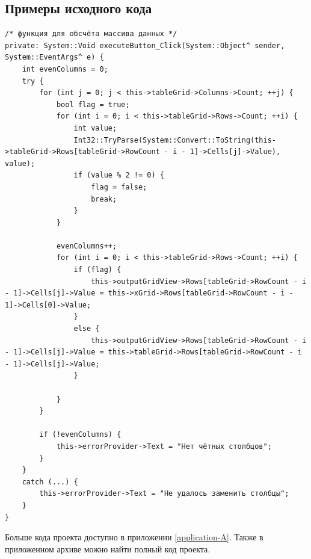 \subsection{Примеры исходного кода}
\begin{verbatim}
/* функция для обсчёта массива данных */
private: System::Void executeButton_Click(System::Object^ sender, System::EventArgs^ e) {
    int evenColumns = 0;
    try {
        for (int j = 0; j < this->tableGrid->Columns->Count; ++j) {
            bool flag = true;
            for (int i = 0; i < this->tableGrid->Rows->Count; ++i) {
                int value;
                Int32::TryParse(System::Convert::ToString(this->tableGrid->Rows[tableGrid->RowCount - i - 1]->Cells[j]->Value), value);
                if (value % 2 != 0) {
                    flag = false;
                    break;
                }
            }
    
            evenColumns++;
            for (int i = 0; i < this->tableGrid->Rows->Count; ++i) {
                if (flag) {
                    this->outputGridView->Rows[tableGrid->RowCount - i - 1]->Cells[j]->Value = this->xGrid->Rows[tableGrid->RowCount - i - 1]->Cells[0]->Value;
                }
                else {
                    this->outputGridView->Rows[tableGrid->RowCount - i - 1]->Cells[j]->Value = this->tableGrid->Rows[tableGrid->RowCount - i - 1]->Cells[j]->Value;
                }
    
            }
        }
    
        if (!evenColumns) {
            this->errorProvider->Text = "Нет чётных столбцов";
        }
    }
    catch (...) {
        this->errorProvider->Text = "Не удалось заменить столбцы";
    }
}
\end{verbatim}

Больше кода проекта доступно в приложении \ref{application-A}. Также в приложенном архиве можно найти полный код проекта.